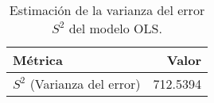 \begin{table}[H]
    \centering
    \color{blue}
    \caption{Estimación de la varianza del error $S^2$ del modelo OLS.}
    \label{tab:varianza_error}
    \begin{tabular}{lr}
        \toprule
        Métrica & Valor \\
        \midrule
        $S^2$ (Varianza del error) & 712.5394 \\
        \bottomrule
    \end{tabular}
\end{table}
